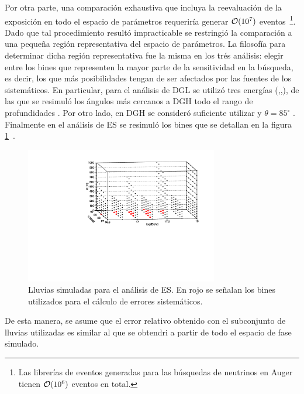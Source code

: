 	Por otra parte, una comparación exhaustiva que incluya la reevaluación de la exposición en todo el espacio de parámetros requeriría generar ${\cal O}(10^7)$ eventos~\footnote{Las librerías de eventos generadas para las búsquedas de neutrinos en Auger tienen ${\cal O}(10^6)$ eventos en total.}. 
	Dado que tal procedimiento result\'o impracticable se restringi\'o la comparación a una pequeña región representativa del espacio de parámetros. 
	La filosofía para determinar dicha región representativa fue la misma en los trés análisis: elegir entre los bines que representen la mayor parte de la sensitividad en la búsqueda, es decir, los que más posibilidades tengan de ser afectados por las fuentes de los sistemáticos.
	En particular, para el análisis de DGL se utilizó tres energías (,,), de las que se resimuló los ángulos más cercanos a DGH todo el rango de profundidades \cite{cite:tesisNavarro}.
	Por otro lado, en DGH se consideró suficiente utilizar  y $\theta=85^\circ$ \cite{cite:tesisJavier}.
	Finalmente en el análisis de ES se resimuló los bines que se detallan en la figura \ref{fig:importantBins_oldWeights}~\cite{cite:tesisYann}.
	\begin{figure}[ht!]
		\begin{center}
			\includegraphics[width=0.75\textwidth]{fig/resultadosAuger/importantBins_oldWeights}
			\caption{Lluvias simuladas para el análisis de ES. En rojo se señalan los bines utilizados para el cálculo de errores sistemáticos.}
			\label{fig:importantBins_oldWeights}
		\end{center}
	\end{figure}
	De esta manera, se asume que el error relativo obtenido con el subconjunto de lluvias utilizadas es similar al que se obtendri a partir de todo el espacio de fase simulado.
	
